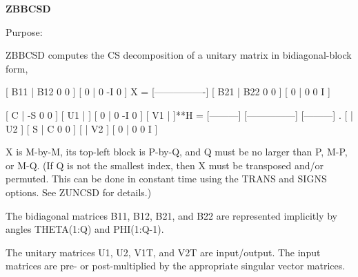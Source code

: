 {\bfseries Z\+B\+B\+C\+S\+D} 

 \begin{DoxyParagraph}{Purpose\+: }
\begin{DoxyVerb} ZBBCSD computes the CS decomposition of a unitary matrix in
 bidiagonal-block form,


     [ B11 | B12 0  0 ]
     [  0  |  0 -I  0 ]
 X = [----------------]
     [ B21 | B22 0  0 ]
     [  0  |  0  0  I ]

                               [  C | -S  0  0 ]
                   [ U1 |    ] [  0 |  0 -I  0 ] [ V1 |    ]**H
                 = [---------] [---------------] [---------]   .
                   [    | U2 ] [  S |  C  0  0 ] [    | V2 ]
                               [  0 |  0  0  I ]

 X is M-by-M, its top-left block is P-by-Q, and Q must be no larger
 than P, M-P, or M-Q. (If Q is not the smallest index, then X must be
 transposed and/or permuted. This can be done in constant time using
 the TRANS and SIGNS options. See ZUNCSD for details.)

 The bidiagonal matrices B11, B12, B21, and B22 are represented
 implicitly by angles THETA(1:Q) and PHI(1:Q-1).

 The unitary matrices U1, U2, V1T, and V2T are input/output.
 The input matrices are pre- or post-multiplied by the appropriate
 singular vector matrices.\end{DoxyVerb}
 
\end{DoxyParagraph}

